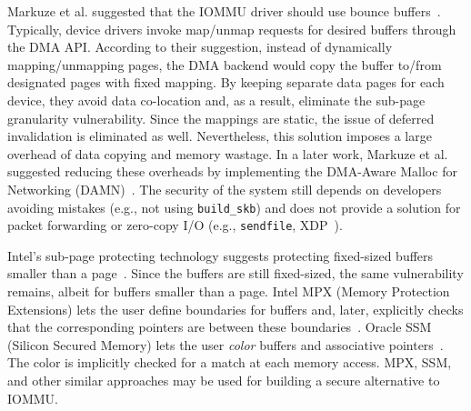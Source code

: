 Markuze et al. suggested that the IOMMU driver should use bounce buffers~\cite{MMT16}. Typically, device drivers invoke map/unmap requests for desired buffers through the DMA API. According to their suggestion, instead of dynamically mapping/unmapping pages, the DMA backend would copy the buffer to/from designated pages with fixed mapping. By keeping separate data pages for each device, they avoid data co-location and, as a result, eliminate the sub-page granularity vulnerability. Since the mappings are static, the issue of deferred invalidation is eliminated as well. 
%
Nevertheless, this solution imposes a large overhead of data copying and memory wastage. In a later work, Markuze et al. suggested reducing these overheads by implementing the DMA-Aware Malloc for Networking (DAMN)~\cite{MSMT18}. The security of the system still depends on developers avoiding mistakes (e.g., not using \texttt{build\_skb}) and does not provide a solution for packet forwarding or zero-copy I/O (e.g., \texttt{sendfile}, XDP~\cite{xdp}). %

Intel’s sub-page protecting technology suggests protecting fixed-sized buffers smaller than a page~\cite{Int18}. Since the buffers are still fixed-sized, the same vulnerability remains, albeit for buffers smaller than a page. Intel MPX (Memory Protection Extensions) lets the user define boundaries for buffers and, later, explicitly checks that the corresponding pointers are between these boundaries~\cite{Int16a}. Oracle SSM (Silicon Secured Memory) lets the user \emph{color} buffers and associative pointers~\cite{Ora15}. The color is implicitly checked for a match at each memory access. MPX, SSM, and other similar approaches may be used for building a secure alternative to IOMMU. 

